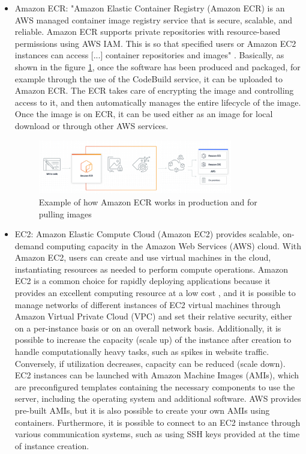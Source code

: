 \begin{itemize}
    \item Amazon ECR: "Amazon Elastic Container Registry (Amazon ECR) is an AWS managed container image registry service that is secure, scalable, and reliable. Amazon ECR supports private repositories with resource-based permissions using AWS IAM. This is so that specified users or Amazon EC2 instances can access [...] container repositories and images" \cite{AmazonECR}. Basically, as shown in the figure \ref{fig:AWSECR}, once the software has been produced and packaged, for example through the use of the CodeBuild service, it can be uploaded to Amazon ECR. The ECR takes care of encrypting the image and controlling access to it, and then automatically manages the entire lifecycle of the image. Once the image is on ECR, it can be used either as an image for local download or through other AWS services. 
    \begin{figure}[h]  %
        \centering
        \includegraphics[width=0.8\textwidth]{images/AWSECR.png}  %
        \caption{Example of how Amazon ECR works in production and for pulling images \cite{AWSECR}}
        \label{fig:AWSECR}
    \end{figure}
    \item EC2: Amazon Elastic Compute Cloud (Amazon EC2) provides scalable, on-demand computing capacity in the Amazon Web Services (AWS) cloud. With Amazon EC2, users can create and use virtual machines in the cloud, instantiating resources as needed to perform compute operations. Amazon EC2 is a common choice for rapidly deploying applications because it provides an excellent computing resource at a low cost \cite{AWSEC2}, and it is possible to manage networks of different instances of EC2 virtual machines through Amazon Virtual Private Cloud (VPC) and set their relative security, either on a per-instance basis or on an overall network basis. Additionally, it is possible to increase the capacity (scale up) of the instance after creation to handle computationally heavy tasks, such as spikes in website traffic. Conversely, if utilization decreases, capacity can be reduced (scale down). EC2 instances can be launched with Amazon Machine Images (AMIs), which are preconfigured templates containing the necessary components to use the server, including the operating system and additional software. AWS provides pre-built AMIs, but it is also possible to create your own AMIs using containers. Furthermore, it is possible to connect to an EC2 instance through various communication systems, such as using SSH keys provided at the time of instance creation.

\end{itemize}
